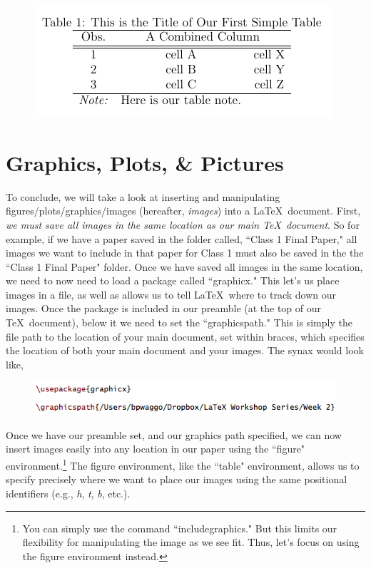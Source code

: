 \documentclass[11pt]{article}
\newcommand{\forceindent}{\leavevmode{\parindent=1.5em\indent}} %
\begin{document}
\begin{figure}[!h]
	\includegraphics[scale=.6]{OUT8} \\ %
	\centering
\end{figure}


\newpage


\section{Graphics, Plots, \& Pictures}

\forceindent To conclude, we will take a look at inserting and manipulating figures/plots/graphics/images (hereafter, \textit{images}) into a \LaTeX\ document. First, \textit{we must save all images in the same location as our main \TeX\ document}. So for example, if we have a paper saved in the folder called, ``Class 1 Final Paper," all images we want to include in that paper for Class 1 must also be saved in the the ``Class 1 Final Paper" folder. Once we have saved all images in the same location, we need to now need to load a package called ``graphicx." This let's us place images in a file, as well as allows us to tell \LaTeX\ where to track down our images. Once the package is included in our preamble (at the top of our \TeX\ document), below it we need to set the ``graphicspath." This is simply the file path to the location of your main document, set within braces, which specifies the location of both your main document and your images. The synax would look like,

\begin{figure}[!h]
	\includegraphics[scale=.5]{CODE9} \\ %
\end{figure}

Once we have our preamble set, and our graphics path specified, we can now insert images easily into any location in our paper using the ``figure" environment.\footnote{You can simply use the command ``includegraphics." But this limits our flexibility for manipulating the image as we see fit. Thus, let's focus on using the figure environment instead.} The figure environment, like the ``table" environment, allows us to specify precisely where we want to place our images using the same positional identifiers (e.g., \textit{h}, \textit{t}, \textit{b}, etc.). \\
\end{document}
